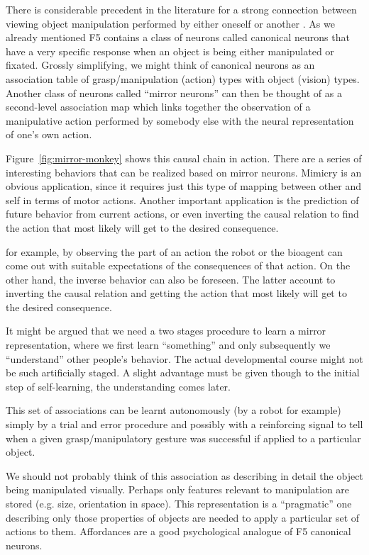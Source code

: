 \ifverbose
There is considerable precedent in the literature for a strong
connection between viewing object manipulation performed by either
oneself or another \cite{wohlsclager02human}.  As we already mentioned
F5 contains a class of neurons called canonical neurons that have a
very specific response when an object is being either manipulated or
fixated.  Grossly simplifying, we might think of canonical neurons as
an association table of grasp/manipulation (action) types with object
(vision) types.  Another class of neurons called ``mirror neurons''
can then be thought of as a second-level association map which links
together the observation of a manipulative action performed by
somebody else with the neural representation of one's own action.
\fi

Figure~\ref{fig:mirror-monkey} shows this causal chain in action.
There are a series of interesting behaviors that can be realized based
on mirror neurons. Mimicry is an obvious application, since it
requires just this type of mapping between other and self in terms of
motor actions.  Another important application is the prediction of
future behavior from current actions, or even inverting the causal
relation to find the action that most likely will get to the desired
consequence.

\ifverbose

for example, by observing the part of an action the robot or the
bioagent can come out with suitable expectations of the consequences
of that action. On the other hand, the inverse behavior can also be
foreseen. The latter account to inverting the causal relation and
getting the action that most likely will get to the desired
consequence.

It might be argued that we need a two stages procedure to learn a
mirror representation, where we first learn ``something'' and only
subsequently we ``understand'' other people's behavior. The actual
developmental course might not be such artificially staged. A slight
advantage must be given though to the initial step of self-learning,
the understanding comes later.


This set of associations can be learnt autonomously (by a robot for
example) simply by a trial and error procedure and possibly with a
reinforcing signal to tell when a given grasp/manipulatory gesture was
successful if applied to a particular object.

We should not probably think of this association as describing in
detail the object being manipulated visually. Perhaps only features
relevant to manipulation are stored (e.g. size, orientation in space).
This representation is a ``pragmatic'' one describing only those
properties of objects are needed to apply a particular set of actions
to them. Affordances are a good psychological analogue of F5
canonical neurons.
\fi


